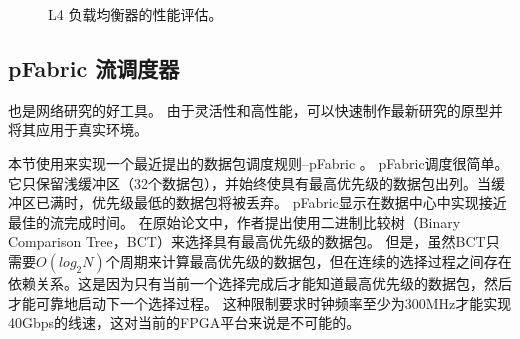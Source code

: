 \begin{figure}[htbp]
	\centering
	
	
	
	\caption{L4 负载均衡器的性能评估。}
	\label{clicknp:fig:l4}
	
\end{figure}


\subsection{pFabric 流调度器}


\name 也是网络研究的好工具。
由于灵活性和高性能，\name 可以快速制作最新研究的原型并将其应用于真实环境。

本节使用\name 来实现一个最近提出的数据包调度规则--pFabric \cite {pfabric}。
pFabric调度很简单。它只保留浅缓冲区（32个数据包），并始终使具有最高优先级的数据包出列。当缓冲区已满时，优先级最低的数据包将被丢弃。
pFabric显示在数据中心中实现接近最佳的流完成时间。
在原始论文中，作者提出使用二进制比较树（Binary Comparison Tree，BCT）来选择具有最高优先级的数据包。
但是，虽然BCT只需要$O(log_2 N)$个周期来计算最高优先级的数据包，但在连续的选择过程之间存在依赖关系。这是因为只有当前一个选择完成后才能知道最高优先级的数据包，然后才能可靠地启动下一个选择过程。
这种限制要求时钟频率至少为300MHz才能实现40Gbps的线速，这对当前的FPGA平台来说是不可能的。



